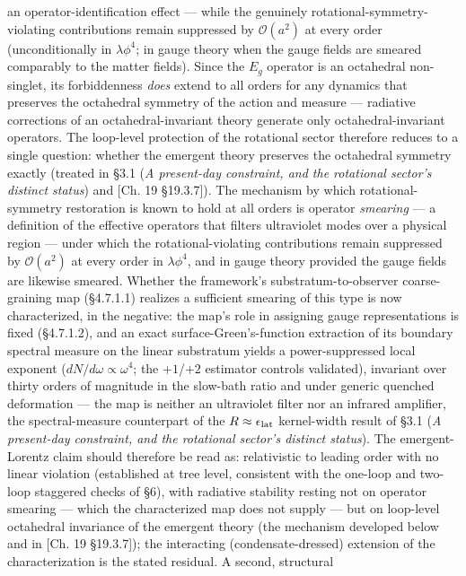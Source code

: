 \documentclass[
]{article}
\begin{document}
an operator-identification effect --- while the genuinely
rotational-symmetry-violating contributions remain suppressed by
\(\mathcal{O}(a^2)\) at every order (unconditionally in
\(\lambda\phi^4\); in gauge theory when the gauge fields are smeared
comparably to the matter fields). Since the \(E_g\) operator is an
octahedral non-singlet, its forbiddenness \emph{does} extend to all
orders for any dynamics that preserves the octahedral symmetry of the
action and measure --- radiative corrections of an octahedral-invariant
theory generate only octahedral-invariant operators. The loop-level
protection of the rotational sector therefore reduces to a single
question: whether the emergent theory preserves the octahedral symmetry
exactly (treated in §3.1 (\emph{A present-day constraint, and the
rotational sector's distinct status}) and {[}Ch. 19 §19.3.7{]}). The
mechanism by which rotational-symmetry restoration is known to hold at
all orders is operator \emph{smearing} --- a definition of the effective
operators that filters ultraviolet modes over a physical region ---
under which the rotational-violating contributions remain suppressed by
\(\mathcal{O}(a^2)\) at every order in \(\lambda\phi^4\), and in gauge
theory provided the gauge fields are likewise smeared. Whether the
framework's substratum-to-observer coarse-graining map (§4.7.1.1)
realizes a sufficient smearing of this type is now characterized, in the
negative: the map's role in assigning gauge representations is fixed
(§4.7.1.2), and an exact surface-Green's-function extraction of its
boundary spectral measure on the linear substratum yields a
power-suppressed local exponent (\(dN/d\omega \propto \omega^{4}\); the
\(+1\)/\(+2\) estimator controls validated), invariant over thirty
orders of magnitude in the slow-bath ratio and under generic quenched
deformation --- the map is neither an ultraviolet filter nor an infrared
amplifier, the spectral-measure counterpart of the
\(R \approx \epsilon_{\rm lat}\) kernel-width result of §3.1 (\emph{A
present-day constraint, and the rotational sector's distinct status}).
The emergent-Lorentz claim should therefore be read as: relativistic to
leading order with no linear violation (established at tree level,
consistent with the one-loop and two-loop staggered checks of §6), with
radiative stability resting not on operator smearing --- which the
characterized map does not supply --- but on loop-level octahedral
invariance of the emergent theory (the mechanism developed below and in
{[}Ch. 19 §19.3.7{]}); the interacting (condensate-dressed) extension of
the characterization is the stated residual. A second, structural
\end{document}
